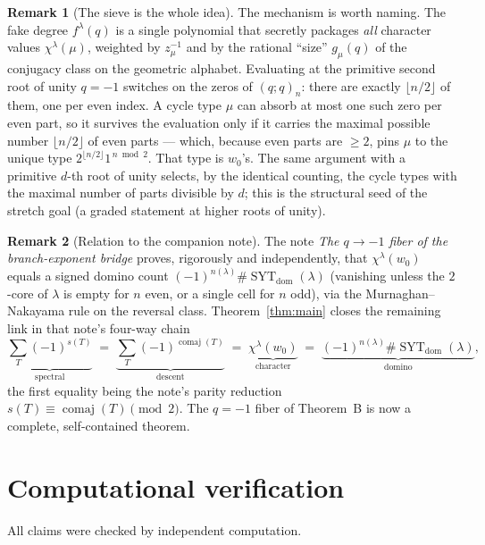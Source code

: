 \documentclass[11pt]{article}
\theoremstyle{definition}
\newtheorem{remark}{Remark}
\DeclareMathOperator{\comaj}{comaj}
\DeclareMathOperator{\SYT}{SYT}
\newcommand{\wzero}{w_0}
\begin{document}
\begin{remark}[The sieve is the whole idea]
The mechanism is worth naming.  The fake degree $f^\lambda(q)$ is a single
polynomial that secretly packages \emph{all} character values $\chi^\lambda(\mu)$,
weighted by $z_\mu^{-1}$ and by the rational ``size'' $g_\mu(q)$ of the conjugacy
class on the geometric alphabet.  Evaluating at the primitive second root of unity
$q=-1$ switches on the zeros of $(q;q)_n$: there are exactly $\lfloor n/2\rfloor$ of
them, one per even index.  A cycle type $\mu$ can absorb at most one such zero per
even part, so it survives the evaluation only if it carries the maximal possible
number $\lfloor n/2\rfloor$ of even parts --- which, because even parts are $\ge 2$,
pins $\mu$ to the unique type $2^{\lfloor n/2\rfloor}1^{\,n\bmod 2}$.  That type is
$\wzero$'s.  The same argument with a primitive $d$-th root of unity selects, by the
identical counting, the cycle types with the maximal number of parts divisible by
$d$; this is the structural seed of the stretch goal (a graded statement at higher
roots of unity).
\end{remark}

\begin{remark}[Relation to the companion note]
The note \emph{The $q\to-1$ fiber of the branch-exponent bridge} proves, rigorously
and independently, that $\chi^\lambda(\wzero)$ equals a signed domino count
$(-1)^{n(\lambda)}\#\SYT_{\mathrm{dom}}(\lambda)$ (vanishing unless the $2$-core of
$\lambda$ is empty for $n$ even, or a single cell for $n$ odd), via the
Murnaghan--Nakayama rule on the reversal class.  Theorem~\ref{thm:main} closes the
remaining link in that note's four-way chain
\[
   \underbrace{\textstyle\sum_T(-1)^{s(T)}}_{\text{spectral}}
   \;=\;\underbrace{\textstyle\sum_T(-1)^{\comaj(T)}}_{\text{descent}}
   \;=\;\underbrace{\chi^\lambda(\wzero)}_{\text{character}}
   \;=\;\underbrace{(-1)^{n(\lambda)}\#\SYT_{\mathrm{dom}}(\lambda)}_{\text{domino}},
\]
the first equality being the note's parity reduction
$s(T)\equiv\comaj(T)\pmod 2$.  The $q=-1$ fiber of Theorem~B is now a complete,
self-contained theorem.
\end{remark}

\section{Computational verification}

All claims were checked by independent computation.
\end{document}
